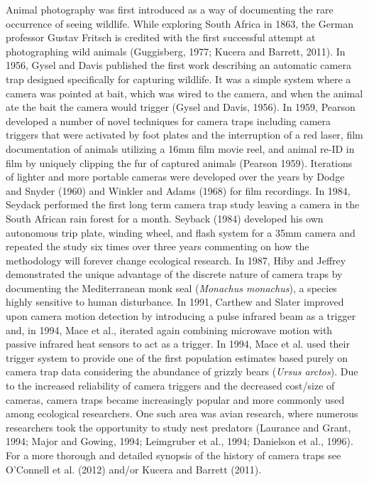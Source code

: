 \documentclass[11pt]{article}
\begin{document}
Animal photography was first introduced as a way of documenting the rare occurrence of seeing wildlife. While exploring South Africa in 1863, the German professor Gustav Fritsch is credited with the first successful attempt at photographing wild animals (Guggisberg, 1977; Kucera and Barrett, 2011). In 1956, Gysel and Davis published the first work describing an automatic camera trap designed specifically for capturing wildlife. It was a simple system where a camera was pointed at bait, which was wired to the camera, and when the animal ate the bait the camera would trigger (Gysel and Davis, 1956). In 1959, Pearson developed a number of novel techniques for camera traps including camera triggers that were activated by foot plates and the interruption of a red laser, film documentation of animals utilizing a 16mm film movie reel, and animal re-ID in film by uniquely clipping the fur of captured animals (Pearson 1959). Iterations of lighter and more portable cameras were developed over the years by Dodge and Snyder (1960) and Winkler and Adams (1968) for film recordings. In 1984, Seydack performed the first long term camera trap study leaving a camera in the South African rain forest for a month. Seyback (1984) developed his own autonomous trip plate, winding wheel, and flash system for a 35mm camera and repeated the study six times over three years commenting on how the methodology will forever change ecological research. In 1987, Hiby and Jeffrey demonstrated the unique advantage of the discrete nature of camera traps by documenting the Mediterranean monk seal (\textit{Monachus monachus}), a species highly sensitive to human disturbance. In 1991, Carthew and Slater improved upon camera motion detection by introducing a pulse infrared beam as a trigger and, in 1994, Mace et al., iterated again combining microwave motion with passive infrared heat sensors to act as a trigger. In 1994, Mace et al. used their trigger system to provide one of the first population estimates based purely on camera trap data considering the abundance of grizzly bears (\textit{Ursus arctos}). Due to the increased reliability of camera triggers and the decreased cost/size of cameras, camera traps became increasingly popular and more commonly used among ecological researchers. One such area was avian research, where numerous researchers took the opportunity to study nest predators (Laurance and Grant, 1994; Major and Gowing, 1994; Leimgruber et al., 1994; Danielson et al., 1996). For a more thorough and detailed synopsis of the history of camera traps see O'Connell et al. (2012) and/or Kucera and Barrett (2011).
\end{document}

